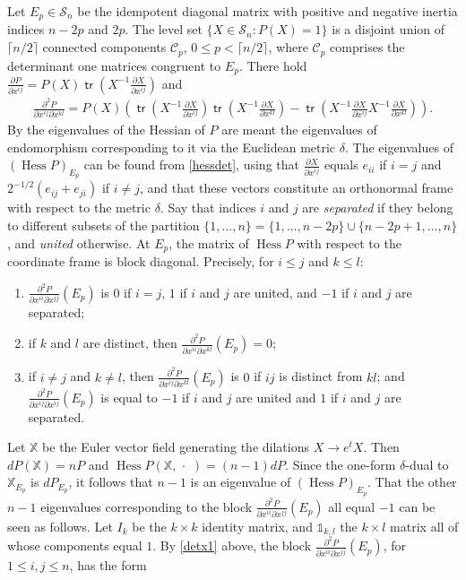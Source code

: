 \documentclass [leqno, 10pt]{amsart}
\theoremstyle{definition}
\numberwithin{equation}{section}
\newcommand{\one}{\mathbb{1}}
\newcommand{\C}{\mathscr{C}}
\newcommand{\sm}{\mathscr{S}}
\newcommand{\hess}{\operatorname{Hess}}
\newcommand{\dum}{\,\cdot\,\,}
\newcommand{\pr}{\partial}
\newcommand{\eul}{\mathbb{X}}
\newcommand{\tr}{\operatorname{\mathsf{tr}}}
\begin{document}
\begin{example}
Let $E_{p} \in \sm_{n}$ be the idempotent diagonal matrix with positive and negative inertia indices $n-2p$ and $2p$.  The level set $\{X \in \sm_{n}: P(X) = 1\}$ is a disjoint union of $\lceil n/2 \rceil$ connected components $\C_{p}$, $0 \leq p < \lceil n/2 \rceil$, where $\C_{p}$ comprises the determinant one matrices congruent to $E_{p}$.
There hold $\tfrac{\pr P}{\pr x^{ij}} = P(X) \tr \left(X^{-1}\tfrac{\pr X}{\pr x^{ij}}\right)$ and
\begin{align}\label{hessdet}
\tfrac{\pr^{2}P}{\pr x^{ij}\pr x^{kl}} = P(X)\left(\tr \left(X^{-1}\tfrac{\pr X}{\pr x^{ij}}\right)\tr \left(X^{-1}\tfrac{\pr X}{\pr x^{kl}}\right) - \tr \left(X^{-1}\tfrac{\pr X}{\pr x^{ij}} X^{-1}\tfrac{\pr X}{\pr x^{kl}}\right)\right).
\end{align}
By the eigenvalues of the Hessian of $P$ are meant the eigenvalues of endomorphism corresponding to it via the Euclidean metric $\delta$.
The eigenvalues of $(\hess P)_{E_{p}}$ can be found from \eqref{hessdet}, using that $\tfrac{\pr X}{\pr x^{ij}}$ equals $e_{ii}$ if $i = j$ and $2^{-1/2}(e_{ij} + e_{ji})$ if $i \neq j$, and that these vectors constitute an orthonormal frame with respect to the metric $\delta$. Say that indices $i$ and $j$ are \textit{separated} if they belong to different subsets of the partition $\{1, \dots, n\} = \{1, \dots, n- 2p\}\cup \{n-2p + 1, \dots, n\}$, and \textit{united} otherwise. At $E_{p}$, the matrix of $\hess P$ with respect to the coordinate frame is block diagonal. Precisely, for $i \leq j$ and $k \leq l$:
\begin{enumerate}
\item\label{detx1} $\tfrac{\pr^{2}P}{\pr x^{ii}\pr x^{jj}}(E_{p})$ is $0$ if $i = j$, $1$ if $i$ and $j$ are united, and $-1$ if $i$ and $j$ are separated; 
\item\label{detx2} if $k$ and $l$ are distinct, then $\tfrac{\pr^{2}P}{\pr x^{ii}\pr x^{kl}}(E_{p}) = 0$;
\item\label{detx3} if $i \neq j$ and $k \neq l$, then $\tfrac{\pr^{2}P}{\pr x^{ij}\pr x^{kl}}(E_{p})$ is $0$ if $ij$ is distinct from $kl$; and $\tfrac{\pr^{2}P}{\pr x^{ij}\pr x^{ij}}(E_{p})$ is equal to $-1$ if $i$ and $j$ are united and $1$ if $i$ and $j$ are separated.  
\end{enumerate}
Let $\eul$ be the Euler vector field generating the dilations $X \to e^{t}X$. Then $dP(\eul) = nP$ and $\hess P(\eul, \dum) = (n-1)dP$. Since the one-form $\delta$-dual to $\eul_{E_{p}}$ is $dP_{E_{p}}$, it follows that $n-1$ is an eigenvalue of $(\hess P)_{E_{p}}$. That the other $n-1$ eigenvalues corresponding to the block $\tfrac{\pr^{2}P}{\pr x^{ii}\pr x^{jj}}(E_{p})$ all equal $-1$ can be seen as follows. Let $I_{k}$ be the $k \times k$ identity matrix, and $\one_{k, l}$ the $k \times l$ matrix all of whose components equal $1$. By \ref{detx1} above, the block $\tfrac{\pr^{2}P}{\pr x^{ii}\pr x^{jj}}(E_{p})$, for $1 \leq i, j \leq n$, has the form

\end{example}
\end{document}
